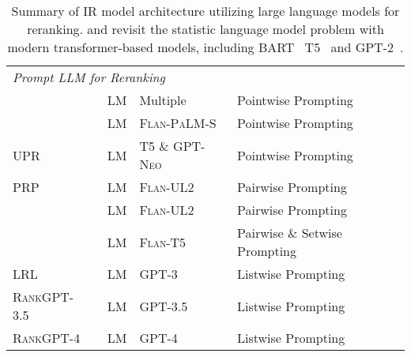 \begin{table*}[ht]
{\begin{tabular}{llll}
\multicolumn{4}{l}{\emph{Prompt LLM for Reranking}} \\
\citet{zhuang-etal-2023-open} & LM & Multiple & Pointwise Prompting \\
\citet{zhuang-etal-2024-beyond} & LM & \textsc{Flan-PaLM-S} & Pointwise Prompting \\
\textsc{UPR}~\cite{sachan-etal-2022-improving} & LM & \textsc{T5} \& \textsc{GPT-Neo} & Pointwise Prompting \\
\textsc{PRP}~\cite{qin-etal-2024-large} & LM & \textsc{Flan-UL2} & Pairwise Prompting \\
\citet{yan-etal-2024-consolidating} & LM & \textsc{Flan-UL2} & Pairwise Prompting \\
\citet{zhuang2024setwise} & LM & \textsc{Flan-T5} & Pairwise \& Setwise Prompting \\
\textsc{LRL}~\cite{ma2023zeroshotlistwisedocumentreranking} & LM & \textsc{GPT-3} & Listwise Prompting \\
\textsc{RankGPT-3.5}~\cite{sun2023chatgpt} & LM & \textsc{GPT-3.5} & Listwise Prompting \\
\textsc{RankGPT-4}~\cite{sun2023chatgpt} & LM & \textsc{GPT-4} & Listwise Prompting \\

\bottomrule
\end{tabular}
}
\caption{Summary of IR model architecture utilizing large language models for reranking. \citet{nogueira-dos-santos-etal-2020-beyond} and \citet{zhuang2021deep} revisit the statistic language model problem with modern transformer-based models, including \textsc{BART}~\cite{lewis-etal-2020-bart} \textsc{T5}~\cite{raffel2020transfer} and \textsc{GPT-2}~\cite{Radford2019LanguageMA}.}
\label{tab:llm4reranking_appendix}
\end{table*}
